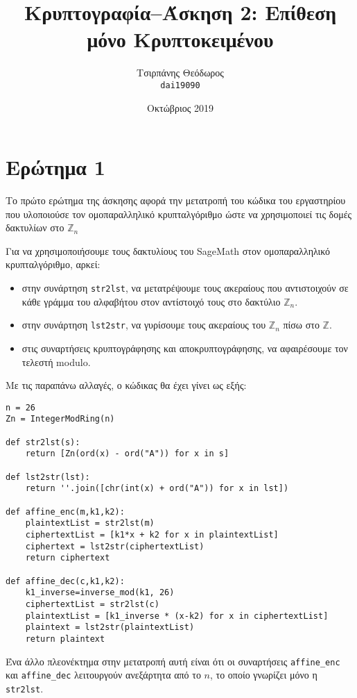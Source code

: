 \documentclass{article}
\title{Κρυπτογραφία--Άσκηση 2: Επίθεση μόνο Κρυπτοκειμένου}
\author{Τσιρπάνης Θεόδωρος\\ \texttt{dai19090}}
\date{Οκτώβριος 2019}
\begin{document}
\maketitle

\section*{Ερώτημα 1}

Το πρώτο ερώτημα της άσκησης αφορά την μετατροπή του κώδικα του εργαστηρίου που υλοποιούσε τον ομοπαραλληλικό κρυπταλγόριθμο ώστε να χρησιμοποιεί τις δομές δακτυλίων στο $\mathbb{Z}_n$

Για να χρησιμοποιήσουμε τους δακτυλίους του SageMath στον ομοπαραλληλικό κρυπταλγόριθμο, αρκεί:

\begin{itemize}
\item στην συνάρτηση \lstinline|str2lst|, να μετατρέψουμε τους ακεραίους που αντιστοιχούν σε κάθε γράμμα του αλφαβήτου στον αντίστοιχό τους στο δακτύλιο $\mathbb{Z}_n$.

\item στην συνάρτηση \lstinline|lst2str|, να γυρίσουμε τους ακεραίους του $\mathbb{Z}_n$ πίσω στο $\mathbb{Z}$.

\item στις συναρτήσεις κρυπτογράφησης και αποκρυπτογράφησης, να αφαιρέσουμε τον τελεστή modulo.
\end{itemize}

Με τις παραπάνω αλλαγές, ο κώδικας θα έχει γίνει ως εξής:

\begin{lstlisting}
n = 26
Zn = IntegerModRing(n)

def str2lst(s):
    return [Zn(ord(x) - ord("A")) for x in s]

def lst2str(lst):
    return ''.join([chr(int(x) + ord("A")) for x in lst])

def affine_enc(m,k1,k2):
    plaintextList = str2lst(m)
    ciphertextList = [k1*x + k2 for x in plaintextList]
    ciphertext = lst2str(ciphertextList)
    return ciphertext

def affine_dec(c,k1,k2):
    k1_inverse=inverse_mod(k1, 26)
    ciphertextList = str2lst(c)
    plaintextList = [k1_inverse * (x-k2) for x in ciphertextList]
    plaintext = lst2str(plaintextList)
    return plaintext
\end{lstlisting}

Ένα άλλο πλεονέκτημα στην μετατροπή αυτή είναι ότι οι συναρτήσεις \lstinline|affine_enc| και \lstinline|affine_dec| λειτουργούν ανεξάρτητα από το $n$, το οποίο γνωρίζει μόνο η \lstinline|str2lst|.
\end{document}
